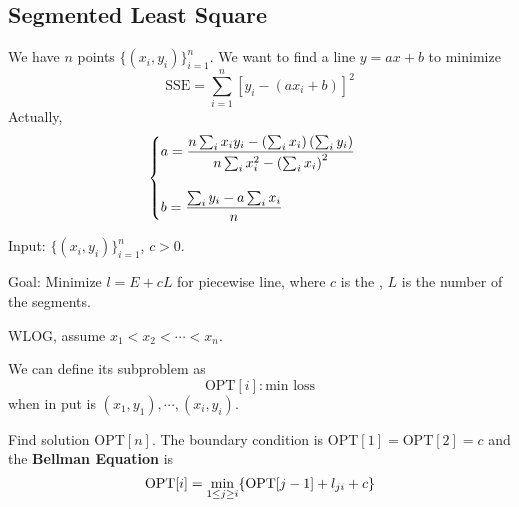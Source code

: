 
\subsection{Segmented Least Square}

\begin{example}
    We have  $ n  $ points  $ \{(x_i,y_i)\}_{i=1}^n $. We want to find a line  $ y=ax+b $ to minimize 
    \begin{equation}
        \mathrm{SSE}=\sum_{i=1}^n[y_i-(ax_i+b)]^2
    \end{equation}  
    Actually, \[ \begin{cases}
        a=\displaystyle\frac{n\sum_ix_iy_i-\left(\sum_ix_i\right)\left(\sum_iy_i\right)}{n\sum_ix_i^2-\left(\sum_ix_i\right)^2}\\
        \\
        b=\displaystyle\frac{\sum_iy_i-a \sum_ix_i}{n}
    \end{cases} \]
\end{example}

\begin{example}
    Input:  $ \{(x_i,y_i)\}_{i=1}^n $,  $ c>0 $.
    
    Goal: Minimize  $ l=E+cL $ for piecewise line, where  $ c $ is the ,  $ L  $ is the number of the segments.
\end{example}

WLOG, assume  $ x_1<x_2<\cdots<x_n $. 

We can define its subproblem as 
\[\mathrm{OPT}[i]:\text{min loss}\]
when in put is  $ (x_1,y_1),\cdots,(x_i,y_i) $.

Find solution  $ \mathrm{OPT}[n] $. The boundary condition is  $ \mathrm{OPT}[1]=\mathrm{OPT}[2]=c $ and the \textbf{Bellman Equation} is 
\[\mathrm{OPT}[i]=\min_{1 \leq j \geq i}\{\mathrm{OPT}[j-1]+l_{ji}+c\}\] 

